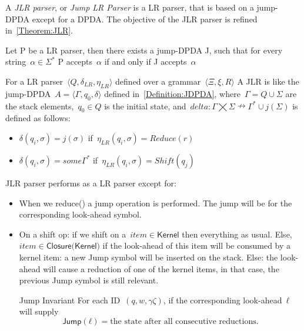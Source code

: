 A \emph{JLR parser}, or \emph{Jump LR Parser} is a LR parser, that 
  is based on a jump-DPDA except for a DPDA\@.
The objective of the JLR parser is refined in~\cref{Theorem:JLR}.
  
\begin{Theorem}
  \label{Theorem:JLR}
  Let P be a LR parser, then there exists a jump-DPDA J,
  such that for every string~$α∈Σ^*$
  P accepts~$α$ if and only if J accepts~$α$
\end{Theorem}

For a LR parser~$\langle Q , \delta_{LR} , η_{LR} \rangle$ defined over a grammar~$\langle \Xi , \xi , R \rangle$
A JLR is like the jump-DPDA~$A=⟨Γ,q_0,δ⟩$ defined in~\cref{Definition:JDPDA},
  where~$\Gamma = Q \cup \Sigma $ are the stack elements,~$q_0 \in Q$ is the initial state, and~$delta:Γ⨉Σ↛Γ^*∪j(\Sigma)$ is defined as follows:
  \begin{itemize}
   \item $\delta(q_i,\sigma)= j(\sigma)$ if~$\eta_{LR}(q_i,\sigma)=Reduce(r)$
   \item $\delta(q_i,\sigma)= some \Gamma^*$ if~$\eta_{LR}(q_i,\sigma)=Shift(q_j)$
  \end{itemize}


JLR parser performs as a LR parser except for:
\begin{itemize}
  \item When we \textsf{reduce()} a jump operation is performed.
    The jump will be for the corresponding look-ahead symbol.

  \item On a shift op:
  if we shift on a~$item∈\textsf{Kernel}$
    then everything as usual.
  Else,~$item∈\textsf{Closure(Kernel)}$
      if the look-ahead of this item will be consumed by a kernel item:
        a new Jump symbol will be inserted on the stack.
      Else:
        the look-ahead will cause a reduction of one of the kernel items,
        in that case, the previous Jump symbol is still relevant.
  \item[Jump Invariant] For each ID~$(q,w,γζ)$, if the corresponding look-ahead~$ℓ$ will 
    supply~\[
      \textsf{Jump}(ℓ)= \text{the state after all consecutive reductions}.
    \]
\end{itemize}
